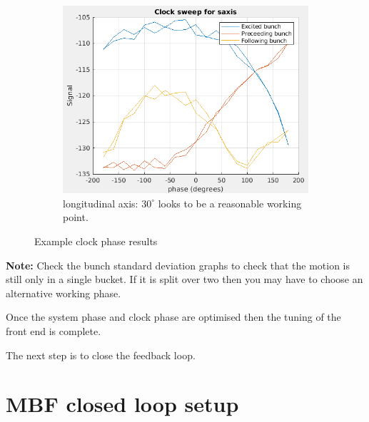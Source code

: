 \documentclass{report}
\begin{document}
\begin{figure}[hbt]
    \begin{subfigure}[b]{0.45\textwidth}
        \includegraphics[width=\textwidth]{vlr_clock_phase_scan_s.png}
        \caption{longitudinal axis: $30^\circ$ looks to be a reasonable working point.}
        \label{fig:frontend_clock_phase_scan_z}
    \end{subfigure}
    \caption{Example clock phase results}
    \label{fig:frontend_clock_phase_scan}
\end{figure}

\textbf{Note:} Check the bunch standard deviation graphs to check that the motion is still only in a single bucket. If it is split over two then you may have to choose an alternative working phase.

Once the system phase and clock phase are optimised then the tuning of the front end is complete.

The next step is to close the feedback loop.
\clearpage
\section{MBF closed loop setup}
\end{document}
